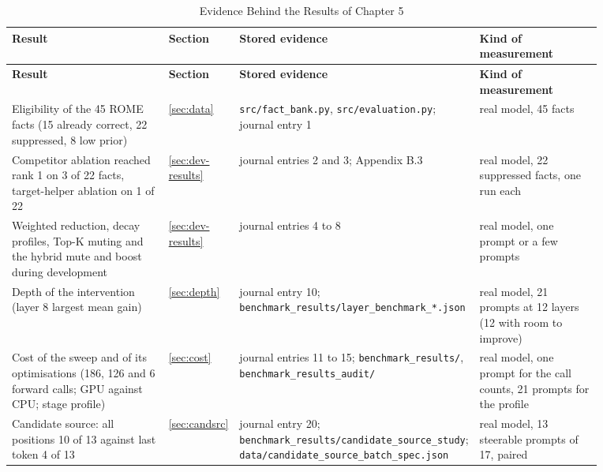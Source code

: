 \documentclass[12pt,a4paper]{report}
\begin{document}
{\small\renewcommand{\arraystretch}{1.15}
\begin{longtable}{|>{\raggedright\arraybackslash}p{0.277\linewidth}|>{\raggedright\arraybackslash}p{0.090\linewidth}|>{\raggedright\arraybackslash}p{0.294\linewidth}|>{\raggedright\arraybackslash}p{0.212\linewidth}|}
\caption{Evidence Behind the Results of Chapter 5}\label{tab:evidence}\\
\hline
\textbf{Result} & \textbf{Section} & \textbf{Stored evidence} & \textbf{Kind of measurement} \\ \hline
\endfirsthead
\hline
\textbf{Result} & \textbf{Section} & \textbf{Stored evidence} & \textbf{Kind of measurement} \\ \hline
\endhead
Eligibility of the 45 ROME facts (15 already correct, 22 suppressed, 8 low prior) & \ref{sec:data} & \texttt{src/\allowbreak{}fact\_\allowbreak{}bank.\allowbreak{}py}, \texttt{src/\allowbreak{}evaluation.\allowbreak{}py}; journal entry 1 & real model, 45 facts \\ \hline
Competitor ablation reached rank 1 on 3 of 22 facts, target-helper ablation on 1 of 22 & \ref{sec:dev-results} & journal entries 2 and 3; Appendix B.3 & real model, 22 suppressed facts, one run each \\ \hline
Weighted reduction, decay profiles, Top-K muting and the hybrid mute and boost during development & \ref{sec:dev-results} & journal entries 4 to 8 & real model, one prompt or a few prompts \\ \hline
Depth of the intervention (layer 8 largest mean gain) & \ref{sec:depth} & journal entry 10; \texttt{benchmark\_\allowbreak{}results/\allowbreak{}layer\_\allowbreak{}benchmark\_\allowbreak{}*.\allowbreak{}json} & real model, 21 prompts at 12 layers (12 with room to improve) \\ \hline
Cost of the sweep and of its optimisations (186, 126 and 6 forward calls; GPU against CPU; stage profile) & \ref{sec:cost} & journal entries 11 to 15; \texttt{benchmark\_\allowbreak{}results/\allowbreak{}}, \texttt{benchmark\_\allowbreak{}results\_\allowbreak{}audit/\allowbreak{}} & real model, one prompt for the call counts, 21 prompts for the profile \\ \hline
Candidate source: all positions 10 of 13 against last token 4 of 13 & \ref{sec:candsrc} & journal entry 20; \texttt{benchmark\_\allowbreak{}results/\allowbreak{}candidate\_\allowbreak{}source\_\allowbreak{}study}; \texttt{data/\allowbreak{}candidate\_\allowbreak{}source\_\allowbreak{}batch\_\allowbreak{}spec.\allowbreak{}json} & real model, 13 steerable prompts of 17, paired \\ \hline

\end{longtable}}
\end{document}
